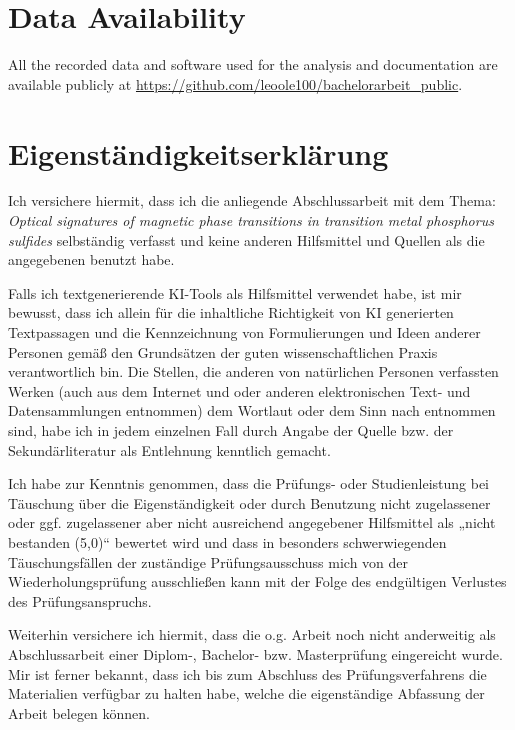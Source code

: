 \documentclass[
	oneside,
	parskip=half,
	a4paper,
]{scrbook}
\begin{document}
\backmatter
\nocite{*}
\printbibliography

\section*{Data Availability}
All the recorded data and software used for the analysis and documentation are available publicly at \url{https://github.com/leoole100/bachelorarbeit_public}.


\clearpage
\section*{Eigenständigkeitserklärung}

Ich versichere hiermit, dass ich die anliegende Abschlussarbeit mit dem Thema:
\textit{Optical signatures of magnetic phase transitions in transition metal phosphorus sulfides}
selbständig verfasst und keine anderen Hilfsmittel und Quellen als die angegebenen benutzt habe.

Falls ich textgenerierende KI-Tools als Hilfsmittel verwendet habe, ist mir bewusst, dass ich allein für
die inhaltliche Richtigkeit von KI generierten Textpassagen und die Kennzeichnung von
Formulierungen und Ideen anderer Personen gemäß den Grundsätzen der guten wissenschaftlichen
Praxis verantwortlich bin. Die Stellen, die anderen von natürlichen Personen verfassten Werken (auch
aus dem Internet und oder anderen elektronischen Text- und Datensammlungen entnommen) dem
Wortlaut oder dem Sinn nach entnommen sind, habe ich in jedem einzelnen Fall durch Angabe der
Quelle bzw. der Sekundärliteratur als Entlehnung kenntlich gemacht.

Ich habe zur Kenntnis genommen, dass die Prüfungs- oder Studienleistung bei Täuschung über die
Eigenständigkeit oder durch Benutzung nicht zugelassener oder ggf. zugelassener aber nicht
ausreichend angegebener Hilfsmittel als „nicht bestanden (5,0)“ bewertet wird und dass in besonders
schwerwiegenden Täuschungsfällen der zuständige Prüfungsausschuss mich von der
Wiederholungsprüfung ausschließen kann mit der Folge des endgültigen Verlustes des
Prüfungsanspruchs.

Weiterhin versichere ich hiermit, dass die o.g. Arbeit noch nicht anderweitig als Abschlussarbeit einer
Diplom-, Bachelor- bzw. Masterprüfung eingereicht wurde. Mir ist ferner bekannt, dass ich bis zum
Abschluss des Prüfungsverfahrens die Materialien verfügbar zu halten habe, welche die
eigenständige Abfassung der Arbeit belegen können.
\end{document}
